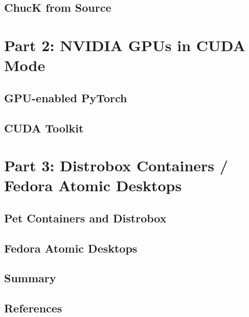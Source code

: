 \documentclass[
  letterpaper,
  DIV=11,
  numbers=noendperiod]{scrreprt}
\newlength{\cslhangindent}
\newenvironment{CSLReferences}[2] %
 {\begin{list}{}{%
  \setlength{\itemindent}{0pt}
  \setlength{\leftmargin}{0pt}
  \setlength{\parsep}{0pt}
  \ifodd #1
   \setlength{\leftmargin}{\cslhangindent}
   \setlength{\itemindent}{-1\cslhangindent}
  \fi
  \setlength{\itemsep}{#2\baselineskip}}}
 {\end{list}}
\begin{document}
\chapter{ChucK from Source}\label{chuck-from-source}

\part{Part 2: NVIDIA GPUs in CUDA Mode}

\chapter{GPU-enabled PyTorch}\label{gpu-enabled-pytorch}

\chapter{CUDA Toolkit}\label{cuda-toolkit}

\part{Part 3: Distrobox Containers / Fedora Atomic Desktops}

\chapter{Pet Containers and
Distrobox}\label{pet-containers-and-distrobox}

\chapter{Fedora Atomic Desktops}\label{fedora-atomic-desktops}


\chapter*{Summary}\label{summary}



\chapter*{References}\label{references}


\label{refs}
\begin{CSLReferences}{0}{1}
\end{CSLReferences}
\end{document}
